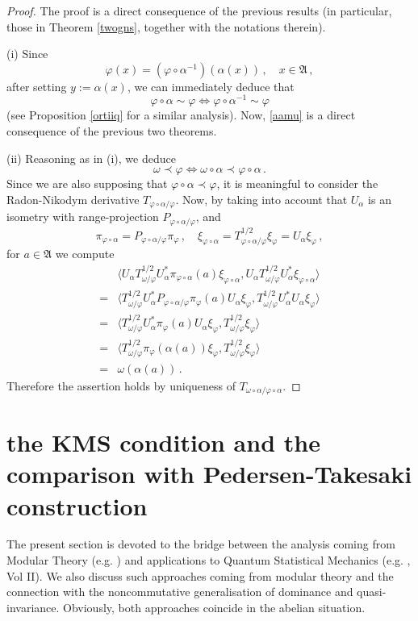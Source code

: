 \documentclass[12pt]{amsart}
\numberwithin{equation}{section}
\def\ga{{\mathfrak A}} \def\gpa{{\mathfrak a}}
\def\a{\alpha}
\def\f{\varphi}\def\ff{\phi} \def\F{\Phi}
\def\om{\omega} \def\Om{\Omega}
\begin{document}
\begin{proof}
The proof is a direct consequence of the previous results (in particular, those in Theorem \ref{twogns}, together with the notations therein).

(i) Since 
$$
\f(x)=(\f\circ\a^{-1})(\a(x))\,,\quad x\in\ga\,,
$$
after setting $y:=\a(x)$, we can immediately deduce that
$$
\f\circ\a\sim\f\iff\f\circ\a^{-1}\sim\f
$$
(see Proposition \ref{ortiiq} for a similar analysis). 
Now, \eqref{aamu} is a direct consequence of the previous two theorems.

(ii) Reasoning as in (i), we deduce 
$$
\om\prec\f\iff \om\circ\a\prec\f\circ\a\,.
$$
Since we are also supposing that $\f\circ\a\prec\f$, it is meaningful to consider the Radon-Nikodym derivative $T_{\f\circ\a/\f}$. Now, by taking into account that $U_\a$ is an isometry with range-projection $P_{\f\circ\a/\f}$, and 
$$
\pi_{\f\circ\a}=P_{\f\circ\a/\f}\pi_\f\,,\quad \xi_{\f\circ\a}=T_{\f\circ\a/\f}^{1/2}\xi_\f=U_\a\xi_\f\,,
$$
for $a\in\ga$ we compute
\begin{align*}
&\langle U_\a T^{1/2}_{\om/\f}U_\a^*\pi_{\f\circ\a}(a)\xi_{\f\circ\a},U_\a T^{1/2}_{\om/\f}U_\a^*\xi_{\f\circ\a}\rangle\\
=&\langle T^{1/2}_{\om/\f}U_\a^*P_{\f\circ\a/\f}\pi_\f(a)U_\a\xi_\f,T^{1/2}_{\om/\f}U_\a^*U_\a\xi_\f\rangle\\
=&\langle T^{1/2}_{\om/\f}U_\a^*\pi_\f(a)U_\a\xi_\f,T^{1/2}_{\om/\f}\xi_\f\rangle\\
=&\langle T^{1/2}_{\om/\f}\pi_\f(\a(a))\xi_\f,T^{1/2}_{\om/\f}\xi_\f\rangle\\
=&\om(\a(a))\,.
\end{align*}
Therefore the assertion holds by uniqueness of $T_{\om\circ\a/\f\circ\a}$.


\end{proof}




\section{the KMS condition and the comparison with Pedersen-Takesaki construction}
\label{PTKMS}

The present section is devoted to the bridge between the analysis coming from Modular Theory (e.g. \cite{PT, S})
and applications to Quantum Statistical Mechanics (e.g. \cite{BR}, Vol II). We also discuss such approaches coming from modular theory and the connection with the noncommutative generalisation of dominance and quasi-invariance.
Obviously, both approaches coincide in the abelian situation.
\end{document}
